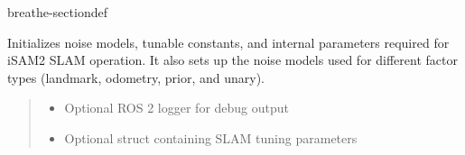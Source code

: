 \documentclass[letterpaper,10pt,english]{sphinxmanual}
\begin{document}
\begin{fulllineitems}
\begin{sphinxuseclass}{breathe-sectiondef}
\begin{fulllineitems}
\sphinxAtStartPar
Initializes noise models, tunable constants, and internal parameters required for iSAM2 SLAM operation. It also sets up the noise models used for different factor types (landmark, odometry, prior, and unary).
\begin{quote}\begin{description}
\begin{itemize}
\item {} 
\sphinxAtStartPar
{} \textendash{} Optional ROS 2 logger for debug output 

\item {} 
\sphinxAtStartPar
{} \textendash{} Optional struct containing SLAM tuning parameters 

\end{itemize}

\end{description}\end{quote}

\end{fulllineitems}


\begin{fulllineitems}
\label{\detokenize{isam2:_CPPv4N4slam8slamISAM8slamISAMEv}}\label{\detokenize{isam2:_CPPv3N4slam8slamISAM8slamISAMEv}}\label{\detokenize{isam2:_CPPv2N4slam8slamISAM8slamISAMEv}}\label{\detokenize{isam2:slam::slamISAM::slamISAM}}
\pysigstartsignatures
\pysigstartmultiline
\pysiglinewithargsret
{\label{\detokenize{isam2:classslam_1_1slamISAM_1a339835603720c6ba0db771b8fd9a8828}}}
{}
{}
\pysigstopmultiline
\pysigstopsignatures
\end{fulllineitems}



\end{sphinxuseclass}
\end{fulllineitems}
\end{document}
